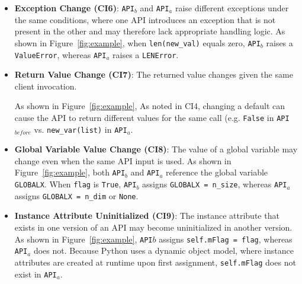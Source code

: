 \begin{itemize}[leftmargin=*]
    \item \textbf{Exception Change (CI6)}: \texttt{API}$_b$ and \texttt{API}$_a$ raise different exceptions under the same conditions, where one API introduces an exception that is not present in the other and may therefore lack appropriate handling logic. As shown in Figure~\ref{fig:example}, when \texttt{len(new\_val)} equals zero, \texttt{API}$_b$ raises a \texttt{ValueError}, whereas \texttt{API}$_a$ raises a \texttt{LENError}.
    

    \item \textbf{Return Value Change (CI7)}: The returned value changes given the same client invocation. 
    
    As shown in Figure~\ref{fig:example},
    As noted in CI4, changing a default can cause the API to return different values for the same call (e.g. \texttt{False} in \texttt{API}$_{before}$ vs. \texttt{new\_var(list)} in \texttt{API}$_{a}$.
    
    \item \textbf{Global Variable Value Change (CI8)}: The value of a global variable may change even when the same API input is used. As shown in Figure~\ref{fig:example}, both \texttt{API}$_b$ and \texttt{API}$_a$ reference the global variable \texttt{GLOBALX}. When \texttt{flag} is \texttt{True}, \texttt{API}$_b$ assigns \texttt{GLOBALX = n\_size}, whereas \texttt{API}$_a$ assigns \texttt{GLOBALX = n\_dim} or \texttt{None}.
    
    
    \item \textbf{Instance Attribute Uninitialized (CI9)}: The instance attribute that exists in one version of an API may become uninitialized in another version. As shown in Figure~\ref{fig:example}, \texttt{API}${b}$ assigns \texttt{self.mFlag = flag}, whereas \texttt{API}${_a}$ does not. Because Python uses a dynamic object model, where instance attributes are created at runtime upon first assignment, \texttt{self.mFlag} does not exist in \texttt{API}$_{a}$.



\end{itemize}














